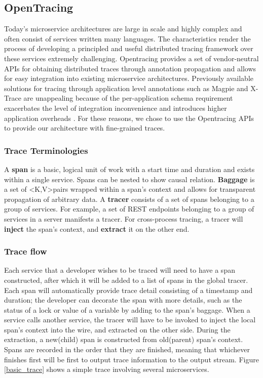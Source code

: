 \subsection{OpenTracing}
Today's microservice architectures are large in scale and highly complex and often consist 
of services written many languages. The characteristics render the process of developing a principled and useful distributed tracing framework over these services
extremely challenging. Opentracing\cite{opentracing:doc} provides a set of vendor-neutral
APIs for obtaining distributed traces through annotation propagation and allows for easy
integration into existing microservice architectures. Previously available solutions for tracing through
application level annotations such as Magpie\cite{magpie} and X-Trace\cite{xtrace} are unappealing
because of the per-application schema requirement exacerbates the level of integration inconvenience and introduces higher application overheads \cite{sigelman:dapper}. For these reasons,
we chose to use the Opentracing APIs to provide our architecture with fine-grained traces. 


\subsubsection{Trace Terminologies}
A \textbf{span} is a basic, logical unit of work with a start time and duration and exists within 
a single service. Spans can be nested to show causal relation. \textbf{Baggage} is a set of \textless K,V\textgreater pairs wrapped within a span's context and allows for transparent propagation of arbitrary data. A \textbf{tracer} consists of a set of spans belonging to a group of services. For example, a set of REST endpoints belonging to a group of services in a server manifests a tracer. For cross-process tracing, a tracer will \textbf{inject} the span's context, and \textbf{extract} it on the other end. 


\subsubsection{Trace flow}
Each service that a developer wishes to be traced will need to have a span constructed, after which it
will be added to a list of spans in the global tracer. Each span will automatically provide trace detail consisting of a timestamp and duration; the developer can decorate the span with more details, such as the status of a lock or value of a variable by adding to the span's baggage. When a service calls another service,
the tracer will have to be invoked to inject the local span's context into the wire, and extracted on the other side. During the extraction, a new(child) span is constructed from old(parent) span's context. Spans are recorded in the order that they are finished, meaning that whichever finishes first will be first to output trace information to the output stream. Figure \ref{basic_trace} shows a simple trace involving several microservices\cite{opentracing:doc}.


